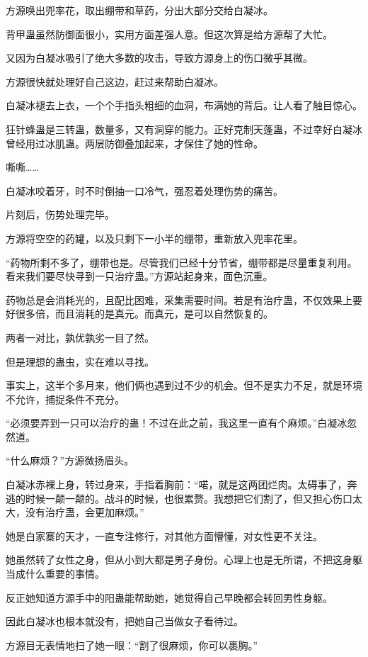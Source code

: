 \begin{this_body}
方源唤出兜率花，取出绷带和草药，分出大部分交给白凝冰。

背甲蛊虽然防御面很小，实用方面差强人意。但这次算是给方源帮了大忙。

又因为白凝冰吸引了绝大多数的攻击，导致方源身上的伤口微乎其微。

方源很快就处理好自己这边，赶过来帮助白凝冰。

白凝冰褪去上衣，一个个手指头粗细的血洞，布满她的背后。让人看了触目惊心。

狂针蜂蛊是三转蛊，数量多，又有洞穿的能力。正好克制天蓬蛊，不过幸好白凝冰曾经用过冰肌蛊。两层防御叠加起来，才保住了她的性命。

嘶嘶……

白凝冰咬着牙，时不时倒抽一口冷气，强忍着处理伤势的痛苦。

片刻后，伤势处理完毕。

方源将空空的药罐，以及只剩下一小半的绷带，重新放入兜率花里。

“药物所剩不多了，绷带也是。尽管我们已经十分节省，绷带都是尽量重复利用。看来我们要尽快寻到一只治疗蛊。”方源站起身来，面色沉重。

药物总是会消耗光的，且配比困难，采集需要时间。若是有治疗蛊，不仅效果上要好很多倍，而且消耗的是真元。而真元，是可以自然恢复的。

两者一对比，孰优孰劣一目了然。

但是理想的蛊虫，实在难以寻找。

事实上，这半个多月来，他们俩也遇到过不少的机会。但不是实力不足，就是环境不允许，捕捉条件不充分。

“必须要弄到一只可以治疗的蛊！不过在此之前，我这里一直有个麻烦。”白凝冰忽然道。

“什么麻烦？”方源微扬眉头。

白凝冰赤裸上身，转过身来，手指着胸前：“喏，就是这两团烂肉。太碍事了，奔逃的时候一颠一颠的。战斗的时候，也很累赘。我想把它们割了，但又担心伤口太大，没有治疗蛊，会更加麻烦。”

她是白家寨的天才，一直专注修行，对其他方面懵懂，对女性更不关注。

她虽然转了女性之身，但从小到大都是男子身份。心理上也是无所谓，不把这身躯当成什么重要的事情。

反正她知道方源手中的阳蛊能帮助她，她觉得自己早晚都会转回男性身躯。

因此白凝冰也根本就没有，把她自己当做女子看待过。

方源目无表情地扫了她一眼：“割了很麻烦，你可以裹胸。”


\end{this_body}
